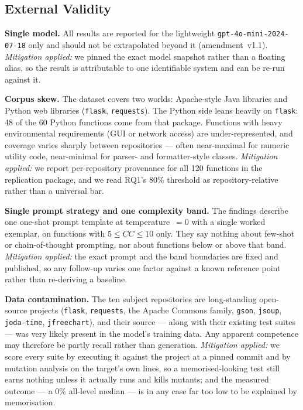 \subsection{External Validity}

\textbf{Single model.} All results are reported for the lightweight
\texttt{gpt-4o-mini-2024-07-18} only and should not be extrapolated beyond it
(amendment~v1.1). \emph{Mitigation applied:} we pinned the exact model snapshot rather than a
floating alias, so the result is attributable to one identifiable system and can be re-run
against it.

\textbf{Corpus skew.} The dataset covers two worlds: Apache-style Java libraries and Python
web libraries (\texttt{flask}, \texttt{requests}). The Python side leans heavily on
\texttt{flask}: 48 of the 60 Python functions come from that package. Functions with heavy
environmental requirements (GUI or network access) are under-represented, and coverage varies
sharply between repositories --- often near-maximal for numeric utility code, near-minimal for
parser- and formatter-style classes. \emph{Mitigation applied:} we report per-repository
provenance for all 120 functions in the replication package, and we read RQ1's 80\% threshold
as repository-relative rather than a universal bar.

\textbf{Single prompt strategy and one complexity band.} The findings describe one one-shot
prompt template at temperature~$=0$ with a single worked exemplar, on functions with
$5 \le CC \le 10$ only. They say nothing about few-shot or chain-of-thought prompting, nor
about functions below or above that band. \emph{Mitigation applied:} the exact prompt and the
band boundaries are fixed and published, so any follow-up varies one factor against a known
reference point rather than re-deriving a baseline.

\textbf{Data contamination.} The ten subject repositories are long-standing open-source
projects (\texttt{flask}, \texttt{requests}, the Apache Commons family, \texttt{gson},
\texttt{jsoup}, \texttt{joda-time}, \texttt{jfreechart}), and their source --- along with
their existing test suites --- was very likely present in the model's training data. Any
apparent competence may therefore be partly recall rather than generation. \emph{Mitigation
applied:} we score every suite by executing it against the project at a pinned commit and by
mutation analysis on the target's own lines, so a memorised-looking test still earns nothing
unless it actually runs and kills mutants; and the measured outcome --- a 0\% all-level median
--- is in any case far too low to be explained by memorisation.

